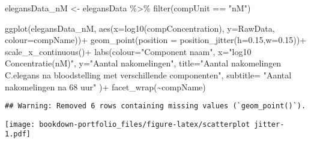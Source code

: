 \documentclass[
]{book}
\newenvironment{Shaded}{\begin{snugshade}}{\end{snugshade}}
\newcommand{\AttributeTok}[1]{\textcolor[rgb]{0.77,0.63,0.00}{#1}}
\newcommand{\FloatTok}[1]{\textcolor[rgb]{0.00,0.00,0.81}{#1}}
\newcommand{\FunctionTok}[1]{\textcolor[rgb]{0.00,0.00,0.00}{#1}}
\newcommand{\NormalTok}[1]{#1}
\newcommand{\OtherTok}[1]{\textcolor[rgb]{0.56,0.35,0.01}{#1}}
\newcommand{\SpecialCharTok}[1]{\textcolor[rgb]{0.00,0.00,0.00}{#1}}
\newcommand{\StringTok}[1]{\textcolor[rgb]{0.31,0.60,0.02}{#1}}
\begin{document}
\begin{Shaded}
\begin{Highlighting}[]
\NormalTok{elegansData\_nM }\OtherTok{\textless{}{-}}\NormalTok{ elegansData }\SpecialCharTok{\%\textgreater{}\%} \FunctionTok{filter}\NormalTok{(compUnit }\SpecialCharTok{==} \StringTok{"nM"}\NormalTok{)}

  \FunctionTok{ggplot}\NormalTok{(elegansData\_nM, }\FunctionTok{aes}\NormalTok{(}\AttributeTok{x=}\FunctionTok{log10}\NormalTok{(compConcentration), }\AttributeTok{y=}\NormalTok{RawData, }\AttributeTok{colour=}\NormalTok{compName))}\SpecialCharTok{+}
  \FunctionTok{geom\_point}\NormalTok{(}\AttributeTok{position =} \FunctionTok{position\_jitter}\NormalTok{(}\AttributeTok{h=}\FloatTok{0.15}\NormalTok{,}\AttributeTok{w=}\FloatTok{0.15}\NormalTok{))}\SpecialCharTok{+}
  \FunctionTok{scale\_x\_continuous}\NormalTok{()}\SpecialCharTok{+}
  \FunctionTok{labs}\NormalTok{(}\AttributeTok{colour=}\StringTok{"Component naam"}\NormalTok{,}
       \AttributeTok{x=}\StringTok{"log10 Concentratie(nM)"}\NormalTok{,}
       \AttributeTok{y=}\StringTok{"Aantal nakomelingen"}\NormalTok{,}
       \AttributeTok{title=}\StringTok{"Aantal nakomelingen C.elegans na bloodstelling met verschillende componenten"}\NormalTok{,}
       \AttributeTok{subtitle=} \StringTok{"Aantal nakomelingen na 68 uur"}
\NormalTok{)}\SpecialCharTok{+}
  \FunctionTok{facet\_wrap}\NormalTok{(}\SpecialCharTok{\textasciitilde{}}\NormalTok{compName)}
\end{Highlighting}
\end{Shaded}

\begin{verbatim}
## Warning: Removed 6 rows containing missing values (`geom_point()`).
\end{verbatim}

\texttt{[image: bookdown-portfolio\_files/figure-latex/scatterplot jitter-1.pdf]}
\end{document}
